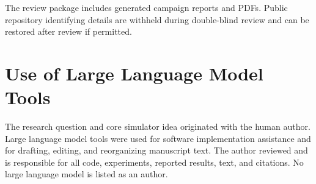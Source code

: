 \documentclass[manuscript,review,anonymous]{acmart}
\begin{document}
The review package includes generated campaign reports and PDFs. Public repository identifying details are withheld during double-blind review and can be restored after review if permitted.

\section*{Use of Large Language Model Tools}

The research question and core simulator idea originated with the human author. Large language model tools were used for software implementation assistance and for drafting, editing, and reorganizing manuscript text. The author reviewed and is responsible for all code, experiments, reported results, text, and citations. No large language model is listed as an author.



\end{document}

